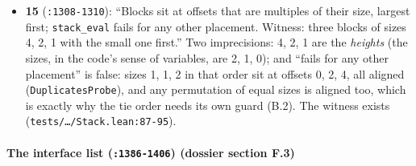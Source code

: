 \begin{itemize}
\item \textbf{15} (\texttt{:1308-{}1310}): \enquote{Blocks sit at offsets that are multiples of their size, largest first; \texttt{stack\_\allowbreak{}eval} fails for any other placement. Witness: three blocks of sizes 4, 2, 1 with the small one first.} Two imprecisions: 4, 2, 1 are the \emph{heights} (the sizes, in the code's sense of variables, are 2, 1, 0); and \enquote{fails for any other placement} is false: sizes 1, 1, 2 in that order sit at offsets 0, 2, 4, all aligned (\texttt{DuplicatesProbe}), and any permutation of equal sizes is aligned too, which is exactly why the tie order needs its own guard (B.2). The witness exists (\texttt{tests/\allowbreak{}…/\allowbreak{}Stack.\allowbreak{}lean:87-{}95}).
\end{itemize}

\paragraph{The interface list (\texttt{:1386-{}1406}) (dossier section F.3)}\label{sec:gen-layer1-F3}

